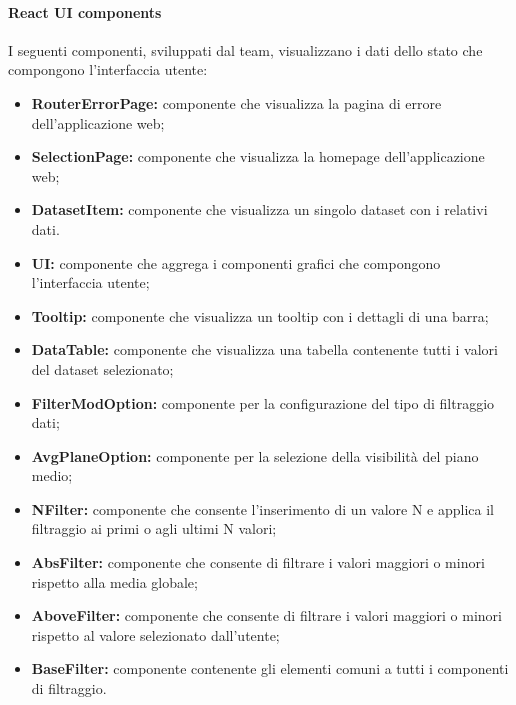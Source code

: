 \paragraph{React UI components}
    I seguenti componenti, sviluppati dal team, visualizzano i dati dello stato che compongono l'interfaccia utente:
    \begin{itemize}
        \item \textbf{RouterErrorPage:} componente che visualizza la pagina di errore dell'applicazione web;
        \item \textbf{SelectionPage:} componente che visualizza la homepage dell'applicazione web;
        \item \textbf{DatasetItem:} componente che visualizza un singolo dataset con i relativi dati.
        \item \textbf{UI:} componente che aggrega i componenti grafici che compongono l'interfaccia utente;
                \item \textbf{Tooltip:} componente che visualizza un tooltip con i dettagli di una barra;
        \item \textbf{DataTable:} componente che visualizza una tabella contenente tutti i valori del dataset selezionato;
        \item \textbf{FilterModOption:} componente per la configurazione del tipo di filtraggio dati;
        \item \textbf{AvgPlaneOption:} componente per la selezione della visibilità del piano medio;
        \item \textbf{NFilter:} componente che consente l'inserimento di un valore N e applica il filtraggio ai primi o agli ultimi N valori;
        \item \textbf{AbsFilter:} componente che consente di filtrare i valori maggiori o minori rispetto alla media globale;
        \item \textbf{AboveFilter:} componente che consente di filtrare i valori maggiori o minori rispetto al valore selezionato dall'utente;
        \item \textbf{BaseFilter:} componente contenente gli elementi comuni a tutti i componenti di filtraggio.
    \end{itemize}

